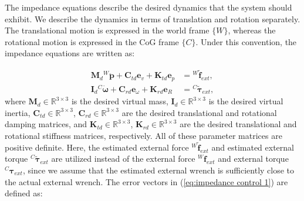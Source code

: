 The impedance equations describe the desired dynamics that the system should exhibit. We describe the dynamics in terms of translation and rotation separately. The translational motion is expressed in the world frame $\{W\}$, whereas the rotational motion is expressed in the CoG frame $\{C\}$. Under this convention, the impedance equations are written as:


\begin{subequations}
\label{eq:impedance control 1}
\begin{align}
    {\boldsymbol{M}_{d}}{^W\!\ddot{\boldsymbol{p}}}+{\boldsymbol{C}_{td}}{\boldsymbol{e}_v}+{\boldsymbol{K}_{td}}{\boldsymbol{e}_p}&={^W\!\boldsymbol{\tilde{f}}_{ext}}, \\[2pt]
    {\boldsymbol{I}_{d}}{^C\!\dot{\boldsymbol{\omega}}}+{\boldsymbol{C}_{rd}}{\boldsymbol{e}_\omega}+{\boldsymbol{K}_{rd}}{\boldsymbol{e}_R}&={^C\!\boldsymbol{\tilde{\tau}}_{ext}},
\end{align}
\end{subequations}
where ${\boldsymbol{M}_{d}}\in \mathbb{R}^{3\times3}$ is the desired virtual mass, ${\boldsymbol{I}_{d}}\in \mathbb{R}^{3\times3}$ is the desired virtual inertia, ${\boldsymbol{C}_{td}}\in \mathbb{R}^{3\times3}$, ${\boldsymbol{C}_{rd}}\in \mathbb{R}^{3\times3}$ are the desired translational and rotational damping matrices, and ${\boldsymbol{K}_{td}}\in \mathbb{R}^{3\times3}$, ${\boldsymbol{K}_{rd}}\in \mathbb{R}^{3\times3}$ are the desired translational and rotational stiffness matrices, respectively. All of these parameter matrices are positive definite. Here, the estimated external force ${^W\!\boldsymbol{\tilde{f}}_{ext}}$ and estimated external torque ${^C\!\boldsymbol{\tilde{\tau}}_{ext}}$ are utilized instead of the external force ${^W\!\boldsymbol{f}}_{ext}$ and external torque ${^C\!\boldsymbol{\tau}_{ext}}$, since we assume that the estimated external wrench is sufficiently close to the actual external wrench. The error vectors in (\ref{eq:impedance control 1}) are defined as:

